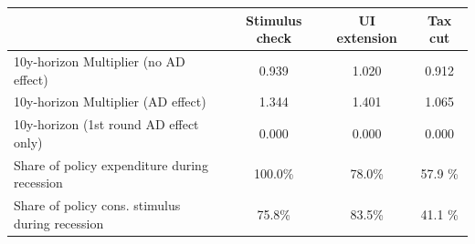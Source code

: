 \begin{tabular}{@{}lccc@{}} 
\toprule 
& Stimulus check    & UI extension    & Tax cut     \\  \midrule 
10y-horizon Multiplier (no AD effect) &0.939  & 1.020  & 0.912     \\ 
10y-horizon Multiplier (AD effect) &1.344  & 1.401  & 1.065     \\ 
10y-horizon (1st round AD effect only) &0.000  & 0.000  & 0.000     \\ 
Share of policy expenditure during recession &100.0\%  & 78.0\%  & 57.9 \%    \\ 
Share of policy cons. stimulus during recession &75.8\%  & 83.5\%  & 41.1 \%    \\ \bottomrule 
\end{tabular}  
